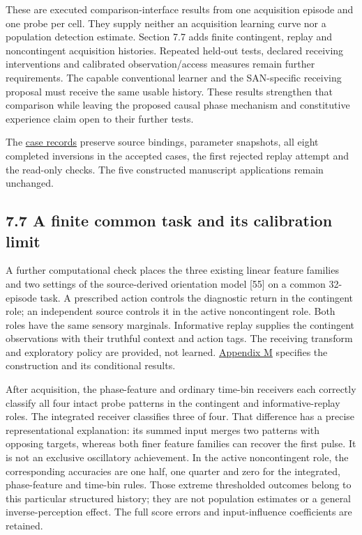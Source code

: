 \documentclass[
  american,
  11pt,
  letterpaper,
]{article}
\begin{document}
These are executed comparison-interface results from one acquisition episode and one probe per cell. They supply neither an acquisition learning curve nor a population detection estimate. Section 7.7 adds finite contingent, replay and noncontingent acquisition histories. Repeated held-out tests, declared receiving interventions and calibrated observation/access measures remain further requirements. The capable conventional learner and the SAN-specific receiving proposal must receive the same usable history. These results strengthen that comparison while leaving the proposed causal phase mechanism and constitutive experience claim open to their further tests.

The \href{https://github.com/v5ma/v5ma.github.io/blob/master/papers/companions/learning-to-feel-v1.0/ARTIFACT-AVAILABILITY.md#artifact-40}{case records} preserve source bindings, parameter snapshots, all eight completed inversions in the accepted cases, the first rejected replay attempt and the read-only checks. The five constructed manuscript applications remain unchanged.

\par\ifdim\dimexpr\pagegoal-\pagetotal\relax<100pt\newpage\fi
\subsection{7.7 A finite common task and its calibration limit}\label{a-finite-common-task-and-its-calibration-limit}

A further computational check places the three existing linear feature families and two settings of the source-derived orientation model {[}55{]} on a common 32-episode task. A prescribed action controls the diagnostic return in the contingent role; an independent source controls it in the active noncontingent role. Both roles have the same sensory marginals. Informative replay supplies the contingent observations with their truthful context and action tags. The receiving transform and exploratory policy are provided, not learned. \href{https://raw.githubusercontent.com/v5ma/v5ma.github.io/master/papers/companions/learning-to-feel-v1.0/Learning-to-Feel-Technical-Supplement-v1.0.pdf\#appendix-m}{Appendix M} specifies the construction and its conditional results.

After acquisition, the phase-feature and ordinary time-bin receivers each correctly classify all four intact probe patterns in the contingent and informative-replay roles. The integrated receiver classifies three of four. That difference has a precise representational explanation: its summed input merges two patterns with opposing targets, whereas both finer feature families can recover the first pulse. It is not an exclusive oscillatory achievement. In the active noncontingent role, the corresponding accuracies are one half, one quarter and zero for the integrated, phase-feature and time-bin rules. Those extreme thresholded outcomes belong to this particular structured history; they are not population estimates or a general inverse-perception effect. The full score errors and input-influence coefficients are retained.
\end{document}
